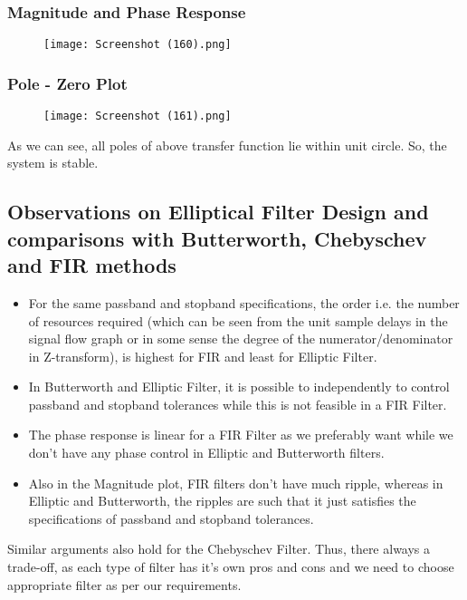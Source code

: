 \documentclass{article}
\begin{document}
\subsubsection{Magnitude and Phase Response}
\begin{figure}[H]
\hspace*{-2.5cm}
    \centering
    \texttt{[image: Screenshot (160).png]}
    \label{fig:my_label}
\end{figure}

\subsubsection{Pole - Zero Plot}
\begin{figure}[H]
\hspace*{-2.5cm}
    \centering
    \texttt{[image: Screenshot (161).png]}
    \label{fig:my_label}
\end{figure}

As we can see, all poles of above transfer function lie within unit circle. So, the system is stable.

\newpage
\subsection{Observations on Elliptical Filter Design and comparisons with Butterworth, Chebyschev and FIR methods}

\begin{itemize}
    \item For the same passband and stopband specifications, the order i.e. the number of resources required (which can be seen from the unit sample delays in the signal flow graph or in some sense the degree of the numerator/denominator in Z-transform), is highest for FIR and least for Elliptic Filter.
    \item In Butterworth and Elliptic Filter, it is possible to independently to control passband and stopband tolerances while this is not feasible in a FIR Filter.
    \item The phase response is linear for a FIR Filter as we preferably want while we don't have any phase control in Elliptic and Butterworth filters.
    \item Also in the Magnitude plot, FIR filters don't have much ripple, whereas in Elliptic and Butterworth, the ripples are such that it just satisfies the specifications of passband and stopband tolerances.
\end{itemize}
Similar arguments also hold for the Chebyschev Filter. Thus, there always a trade-off, as each type of filter has it's own pros and cons and we need to choose appropriate filter as per our requirements.
\end{document}
